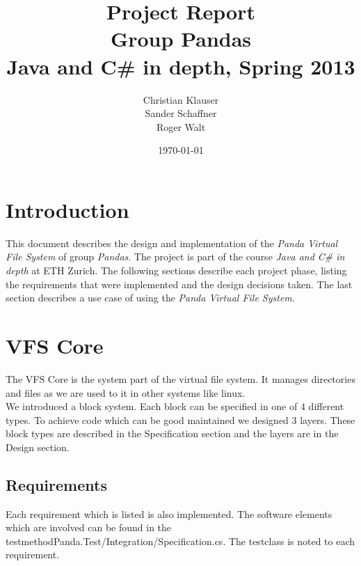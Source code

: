 \documentclass[a4paper,12pt]{article}
\title{
Project Report \\ 
Group Pandas \\
\vspace{5mm}
\large Java and C\# in depth, Spring 2013
}
\author{
Christian Klauser \\
Sander Schaffner \\
Roger Walt
}
\date{\today}
\begin{document}
\maketitle

\section{Introduction}

This document describes the design and implementation of the \emph{Panda Virtual File System} of group \emph{Pandas}. The project is part of the course \emph{Java and C\# in depth} at ETH Zurich. The following sections describe each project phase, listing the requirements that were implemented and the design decisions taken. The last section describes a use case of using the \emph{Panda Virtual File System}.


\section{VFS Core}

The VFS Core is the system part of the virtual file system. It manages directories and files as we are used to it in other systems like linux.\\

We introduced a block system. Each block can be specified in one of 4 different types. To achieve code which can be good maintained we designed 3 layers. These block types are described in the Specification section and the layers are in the Design section.

\subsection{Requirements}

Each requirement which is listed is also implemented. The software elements which are involved can be found in the testmethod\newline Panda.Test/Integration/Specification.cs. The testclass is noted to each requirement.
\end{document}
